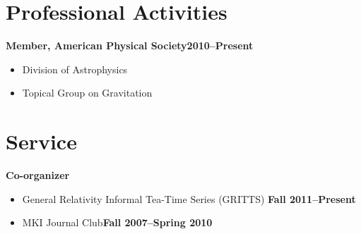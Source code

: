 \documentclass[margin,line]{res}
\begin{document}
\begin{resume}
\section{\sc Professional Activities}
{\bf Member, American Physical Society}\hfill{\bf 2010--Present}
\vspace*{.05in}  
\begin{itemize}
\item[] Division of Astrophysics
\item[] Topical Group on Gravitation
\end{itemize}

\section{\sc Service}
{\bf Co-organizer}
\vspace*{.05in}
\begin{itemize}
\item[] General Relativity Informal Tea-Time Series (GRITTS)\hfill {\bf
    Fall 2011--Present}
\item[] MKI Journal Club\hfill {\bf Fall 2007--Spring 2010}
\end{itemize}

\end{resume}
\end{document}
